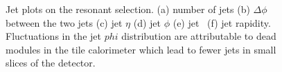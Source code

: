 \begin{figure}[htb]
  \caption{Jet plots on %
  the resonant selection. (a) number of jets (b) $\Delta\phi$ between the two jets (c) jet $\eta$
  (d) jet $\phi$ (e) jet \pt\ (f) jet rapidity.  Fluctuations in the jet $phi$ distribution are attributable to dead modules in the tile calorimeter which lead to fewer jets in small slices of the detector.}
 \label{fig:QGmonitoring5}
\end{figure}


